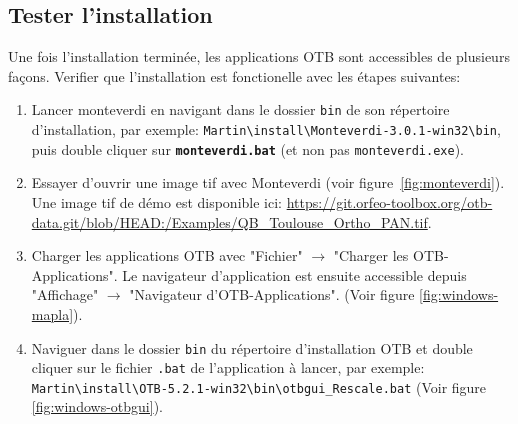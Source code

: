 \documentclass[10pt,a4paper]{article}
\begin{document}
\subsection{Tester l'installation}
Une fois l'installation terminée, les applications OTB sont accessibles de
plusieurs façons. Verifier que l'installation est fonctionelle avec les étapes
suivantes:
\begin{enumerate}

\item Lancer monteverdi en navigant dans le dossier \texttt{bin} de son répertoire
d'installation, par exemple:
\texttt{Martin{\textbackslash}install{\textbackslash}Monteverdi-3.0.1-win32{\textbackslash}bin},
puis double cliquer sur \textbf{\texttt{monteverdi.bat}} (et non pas
\texttt{monteverdi.exe}).

\item Essayer d'ouvrir une image tif avec Monteverdi (voir
  figure~\ref{fig:monteverdi}). Une image tif de démo est
disponible ici: \url{https://git.orfeo-toolbox.org/otb-data.git/blob/HEAD:/Examples/QB\_Toulouse\_Ortho\_PAN.tif}.

\item Charger les applications OTB avec "Fichier" $\rightarrow$ "Charger les
OTB-Applications".
Le navigateur d'application est ensuite accessible depuis "Affichage"
$\rightarrow$ "Navigateur d'OTB-Applications".
(Voir figure \ref{fig:windows-mapla}).

\item Naviguer dans le dossier \texttt{bin} du répertoire d'installation OTB et double cliquer sur le
fichier \texttt{.bat} de l'application à lancer, par exemple:\\
\texttt{Martin{\textbackslash}install{\textbackslash}OTB-5.2.1-win32{\textbackslash}bin{\textbackslash}otbgui\_Rescale.bat}
(Voir figure \ref{fig:windows-otbgui}).

\end{enumerate}
\end{document}
